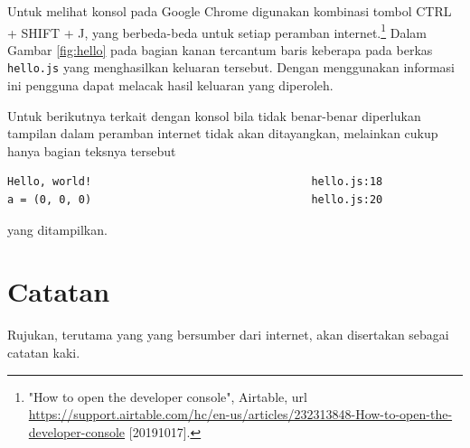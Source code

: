 Untuk melihat konsol pada Google Chrome digunakan kombinasi tombol CTRL + SHIFT + J, yang berbeda-beda untuk setiap peramban internet.\footnote{"How to open the developer console", Airtable, url \url{https://support.airtable.com/hc/en-us/articles/232313848-How-to-open-the-developer-console} [20191017].} Dalam Gambar \ref{fig:hello} pada bagian kanan tercantum baris keberapa pada berkas \verb|hello.js| yang menghasilkan keluaran tersebut. Dengan menggunakan informasi ini pengguna dapat melacak hasil keluaran yang diperoleh.

Untuk berikutnya terkait dengan konsol bila tidak benar-benar diperlukan tampilan dalam peramban internet tidak akan ditayangkan, melainkan cukup hanya bagian teksnya tersebut

\begin{lstlisting}[numbers=none]
Hello, world!                                  hello.js:18
a = (0, 0, 0)                                  hello.js:20
\end{lstlisting}

yang ditampilkan.


%
\section{Catatan}
Rujukan, terutama yang yang bersumber dari internet, akan disertakan sebagai catatan kaki.